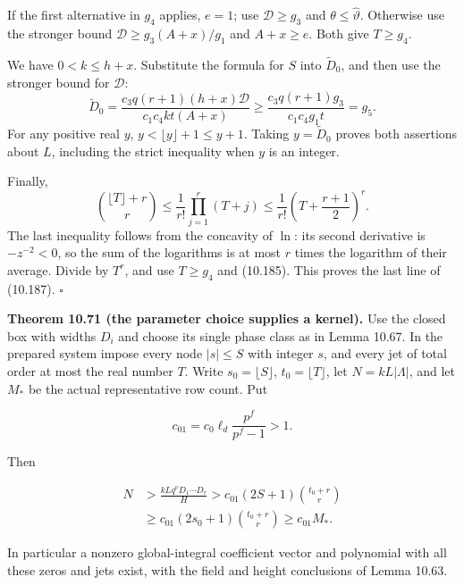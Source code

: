 \documentclass[
  11pt,
  a4paper,
]{article}
\begin{document}
If the first alternative in \(g_4\) applies, \(e=1\); use
\(\mathcal D\ge g_3\) and \(\theta\le\widehat\vartheta\). Otherwise use
the stronger bound \(\mathcal D\ge g_3(A+x)/g_1\) and \(A+x\ge e\). Both
give \(T\ge g_4\).

We have \(0<k\le h+x\). Substitute the formula for \(S\) into
\(\widetilde D_0\), and then use the stronger bound for \(\mathcal D\):
\[
\widetilde D_0=
\frac{c_3q(r+1)(h+x)\mathcal D}{c_1c_4kt(A+x)}
\ge\frac{c_3q(r+1)g_3}{c_1c_4g_1t}=g_5.
\] For any positive real \(y\), \(y<\lfloor y\rfloor+1\le y+1\). Taking
\(y=\widetilde D_0\) proves both assertions about \(L\), including the
strict inequality when \(y\) is an integer.

Finally, \[
\binom{\lfloor T\rfloor+r}{r}
\le\frac1{r!}\prod_{j=1}^r(T+j)
\le\frac1{r!}\left(T+\frac{r+1}{2}\right)^r.
\] The last inequality follows from the concavity of \(\ln\): its second
derivative is \(-z^{-2}<0\), so the sum of the logarithms is at most
\(r\) times the logarithm of their average. Divide by \(T^r\), and use
\(T\ge g_4\) and (10.185). This proves the last line of (10.187).
\(\square\)

\textbf{Theorem 10.71 (the parameter choice supplies a kernel).} Use the
closed box with widths \(D_i\) and choose its single phase class as in
Lemma 10.67. In the prepared system impose every node \(|s|\le S\) with
integer \(s\), and every jet of total order at most the real number
\(T\). Write \(s_0=\lfloor S\rfloor\), \(t_0=\lfloor T\rfloor\), let
\(N=kL|\Lambda|\), and let \(M_*\) be the actual representative row
count. Put

\[
c_{01}=c_0\ell_d\frac{p^f}{p^f-1}>1.
\tag{10.189}
\]

Then

\[
\begin{aligned}
N&>\frac{kLq^\nu D_1\cdots D_r}{H}
>c_{01}(2S+1)\binom{t_0+r}{r}\\
&\ge c_{01}(2s_0+1)\binom{t_0+r}{r}
\ge c_{01}M_*.
\end{aligned}
\tag{10.190}
\]

In particular a nonzero global-integral coefficient vector and
polynomial with all these zeros and jets exist, with the field and
height conclusions of Lemma 10.63.
\end{document}
